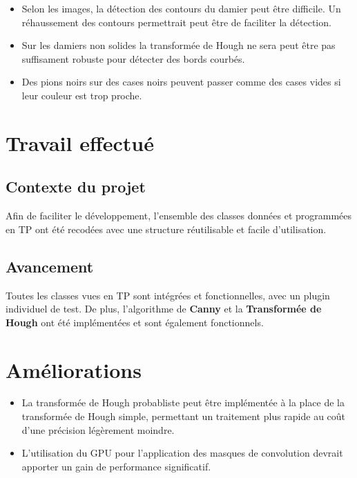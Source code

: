 \documentclass[a4paper, 12pt]{report}
\begin{document}
\begin{itemize}
\item Selon les images, la détection des contours du damier peut être difficile. Un réhaussement des contours permettrait peut être de faciliter la détection.
\item Sur les damiers non solides la transformée de Hough ne sera peut être pas suffisament robuste pour détecter des bords courbés.
\item Des pions noirs sur des cases noirs peuvent passer comme des cases vides si leur couleur est trop proche.
\end{itemize}

\section{Travail effectué}

\subsection*{Contexte du projet}

Afin de faciliter le développement, l'ensemble des classes données et programmées en TP ont été recodées avec une structure réutilisable et facile d'utilisation.

\subsection*{Avancement}

Toutes les classes vues en TP sont intégrées et fonctionnelles, avec un plugin individuel de test. De plus, l'algorithme de \textbf{Canny} et la \textbf{Transformée de Hough} ont été implémentées et sont également fonctionnels.

\section{Améliorations}

\begin{itemize}
\item La transformée de Hough probabliste peut être implémentée à la place de la transformée de Hough simple, permettant un traitement plus rapide au coût d'une précision légèrement moindre.
\item L'utilisation du GPU pour l'application des masques de convolution devrait apporter un gain de performance significatif.
\end{itemize}
\end{document}
